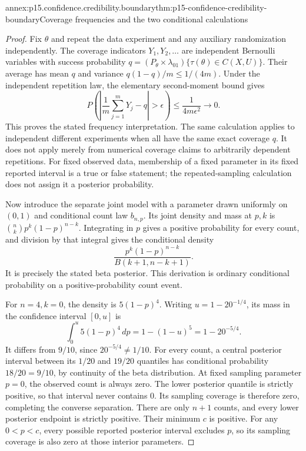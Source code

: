 \begin{annexitem}{annex:p15.confidence.credibility.boundary}{thm:p15-confidence-credibility-boundary}{Coverage frequencies and the two conditional calculations}
\begin{proof}
Fix \(\theta\) and repeat
the data experiment and
any auxiliary randomization
independently. The coverage
indicators \(Y_1,Y_2,\ldots\)
are independent Bernoulli
variables with success
probability
\(q=(P_\theta\times\lambda_{01})\{\tau(\theta)\in C(X,U)\}\).
Their average has mean
\(q\) and variance
\(q(1-q)/m\leq1/(4m)\).
Under the independent repetition law,
the elementary second-moment bound gives
\[
 P\left(\left|
       \frac1m\sum_{j=1}^mY_j-q\right|>\epsilon\right)
                    \leq\frac1{4m\epsilon^2}\longrightarrow0.
\]
This proves the stated
frequency interpretation.
The same calculation
applies to independent
different experiments
when all have the same
exact coverage \(q\).
It does not apply merely
from numerical coverage
claims to arbitrarily
dependent repetitions.
For fixed observed data,
membership of a fixed
parameter in its fixed
reported interval is a
true or false statement;
the repeated-sampling
calculation does not
assign it a posterior
probability.

Now introduce the separate
joint model with a parameter
drawn uniformly on \((0,1)\)
and conditional count
law \(b_{n,p}\). Its
joint density and mass
at \(p,k\) is
\(\binom nkp^k(1-p)^{n-k}\).
Integrating in \(p\)
gives a positive
probability for every
count, and division by
that integral gives
the conditional density
\[
                  \frac{p^k(1-p)^{n-k}}
                              {B(k+1,n-k+1)}.
\]
It is precisely the
stated beta posterior.
This derivation is
ordinary conditional
probability on a
positive-probability
count event.

For \(n=4,k=0\), the
density is \(5(1-p)^4\).
Writing \(u=1-20^{-1/4}\),
its mass in the confidence
interval \([0,u]\) is
\[
                    \int_0^u5(1-p)^4\,dp
                      =1-(1-u)^5=1-20^{-5/4}.
\]
It differs from \(9/10\),
since \(20^{-5/4}\ne1/10\).
For every count, a
central posterior interval
between its \(1/20\)
and \(19/20\) quantiles
has conditional probability
\(18/20=9/10\), by
continuity of the beta
distribution.
At fixed sampling
parameter \(p=0\),
the observed count is
always zero. The lower
posterior quantile is
strictly positive,
so that interval never
contains 0. Its sampling
coverage is therefore
zero, completing the
converse separation. There are
only \(n+1\) counts, and
every lower posterior endpoint
is strictly positive. Their
minimum \(c\) is positive.
For any \(0<p<c\), every
possible reported posterior
interval excludes \(p\), so
its sampling coverage is
also zero at those interior
parameters.
\end{proof}
\end{annexitem}
